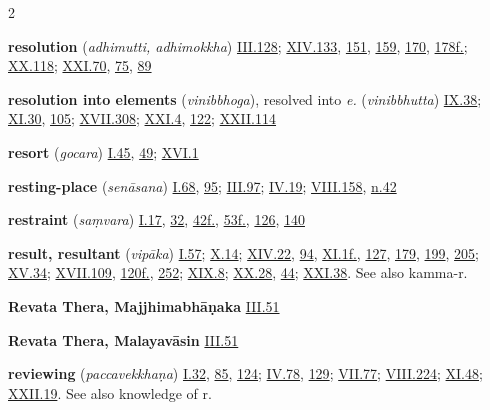 \begin{multicols}{2}
\begin{vismHanging}
\par\textbf{resolution} (\emph{adhimutti, adhimokkha}) \hyperlink{III.128}{III.128}{}; \hyperlink{XIV.133}{XIV.133}{}, \hyperlink{XIV.151}{151}{}, \hyperlink{XIV.159}{159}{}, \hyperlink{XIV.170}{170}{}, \hyperlink{XIV.178}{178f.}{}; \hyperlink{XX.118}{XX.118}{}; \hyperlink{XXI.70}{XXI.70}{}, \hyperlink{XXI.75}{75}{}, \hyperlink{XXI.89}{89}{}
\par\textbf{resolution into elements} (\emph{vinibbhoga}), resolved into \emph{e. }(\emph{vinibbhutta}) \hyperlink{IX.38}{IX.38}{}; \hyperlink{XI.30}{XI.30}{}, \hyperlink{XI.105}{105}{}; \hyperlink{XVII.308}{XVII.308}{}; \hyperlink{XXI.4}{XXI.4}{}, \hyperlink{XXI.122}{122}{}; \hyperlink{XXII.114}{XXII.114}{}
\par\textbf{resort} (\emph{gocara}) \hyperlink{I.45}{I.45}{}, \hyperlink{I.49}{49}{}; \hyperlink{XVI.1}{XVI.1}{}
\par\textbf{resting-place} (\emph{senāsana}) \hyperlink{I.68}{I.68}{}, \hyperlink{I.95}{95}{}; \hyperlink{III.97}{III.97}{}; \hyperlink{IV.19}{IV.19}{}; \hyperlink{VIII.158}{VIII.158}{}, \hyperlink{VIII.n42}{n.42}{}
\par\textbf{restraint} (\emph{saṃvara}) \hyperlink{I.17}{I.17}{}, \hyperlink{I.32}{32}{}, \hyperlink{I.42}{42f.}{}, \hyperlink{I.53}{53f.}{}, \hyperlink{I.126}{126}{}, \hyperlink{I.140}{140}{}
\par\textbf{result, resultant} (\emph{vipāka}) \hyperlink{I.57}{I.57}{}; \hyperlink{X.14}{X.14}{}; \hyperlink{XIV.22}{XIV.22}{}, \hyperlink{XIV.94}{94}{}, \hyperlink{XI.1}{XI.1f.}{}, \hyperlink{XI.127}{127}{}, \hyperlink{XI.179}{179}{}, \hyperlink{XI.199}{199}{}, \hyperlink{XI.205}{205}{}; \hyperlink{XV.34}{XV.34}{}; \hyperlink{XVII.109}{XVII.109}{}, \hyperlink{XVII.120}{120f.}{}, \hyperlink{XVII.252}{252}{}; \hyperlink{XIX.8}{XIX.8}{}; \hyperlink{XX.28}{XX.28}{}, \hyperlink{XX.44}{44}{}; \hyperlink{XXI.38}{XXI.38}{}. See also kamma-r. 
\par\textbf{Revata Thera, Majjhimabhāṇaka} \hyperlink{III.51}{III.51}{}
\par\textbf{Revata Thera, Malayavāsin} \hyperlink{III.51}{III.51}{}
\par\textbf{reviewing} (\emph{paccavekkhaṇa}) \hyperlink{I.32}{I.32}{}, \hyperlink{I.85}{85}{}, \hyperlink{I.124}{124}{}; \hyperlink{IV.78}{IV.78}{}, \hyperlink{IV.129}{129}{}; \hyperlink{VII.77}{VII.77}{}; \hyperlink{VIII.224}{VIII.224}{}; \hyperlink{XI.48}{XI.48}{}; \hyperlink{XXII.19}{XXII.19}{}. See also knowledge of r. 

\end{vismHanging}
\end{multicols}
